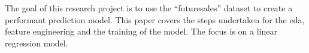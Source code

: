 
\begin{sciabstract}
The goal of this research project is to use the \enquote{\gls{futuresales}} dataset to create a performant prediction model. This paper covers the steps undertaken for the \acrshort{eda}, feature engineering and the training of the model. The focus is on a linear regression model.
\end{sciabstract}

\clearpage
